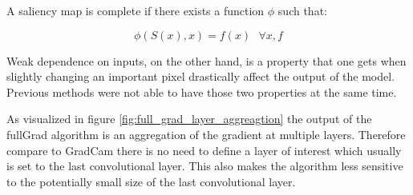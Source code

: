 A saliency map is complete if there exists a function $\phi$ such that:

$$\phi(S(x), x) = f(x) \text{ } \forall x,f$$

Weak dependence on inputs, on the other hand, is a property that one gets when slightly changing an important pixel drastically affect the output of the model. Previous methods were not able to have those two properties at the same time.

As visualized in figure \ref{fig:full_grad_layer_aggreagtion} the output of the fullGrad algorithm is an aggregation of the gradient at multiple layers. Therefore compare to GradCam there is no need to define a layer of interest which usually is set to the last convolutional layer. This also makes the algorithm less sensitive to the potentially small size of the last convolutional layer.